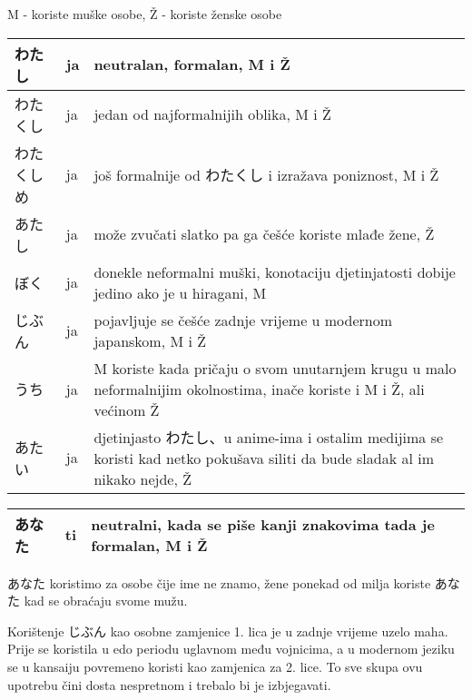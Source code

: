 
\author{Tomislav Mamić, Željka Ludošan}

	
		
	M - koriste muške osobe, Ž - koriste ženske osobe
	
	
	\begin{tabular}{|l|l|p{400pt}|}
		\hline
		わたし&ja&neutralan, formalan, M i Ž\\\hline
		わたくし&ja&jedan od najformalnijih oblika, M i Ž\\\hline
		わたくしめ&ja&još formalnije od わたくし i izražava poniznost, M i Ž\\\hline
		あたし&ja&može zvučati slatko pa ga češće koriste mlađe žene, Ž\\\hline
		ぼく&ja&donekle neformalni muški, konotaciju djetinjatosti dobije jedino ako je u hiragani, M\\\hline
		じぶん&ja&pojavljuje se češće zadnje vrijeme u modernom japanskom, M i Ž\\\hline
		うち&ja&M koriste kada pričaju o svom unutarnjem krugu u malo neformalnijim okolnostima, inače koriste i M i Ž, ali većinom Ž\\\hline
		あたい&ja&djetinjasto わたし、u anime-ima i ostalim medijima se koristi kad netko pokušava siliti da bude sladak al im nikako nejde, Ž\\\hline
	\end{tabular}
	
	\vspace{10pt}
	
		\begin{tabular}{|l|l|l|}
		\hline
		あなた&ti&neutralni, kada se piše kanji znakovima tada je formalan, M i Ž\\\hline
		\end{tabular}
		
		
	\vspace{10pt}
	
	あなた koristimo za osobe čije ime ne znamo, žene ponekad od milja koriste あなた kad se obraćaju svome mužu.
	
	Korištenje じぶん kao osobne zamjenice 1. lica je u zadnje vrijeme uzelo maha. Prije se koristila u edo periodu uglavnom među vojnicima, a u modernom jeziku se u kansaiju povremeno koristi kao zamjenica za 2. lice. To sve skupa ovu upotrebu čini dosta nespretnom i trebalo bi je izbjegavati.
	
